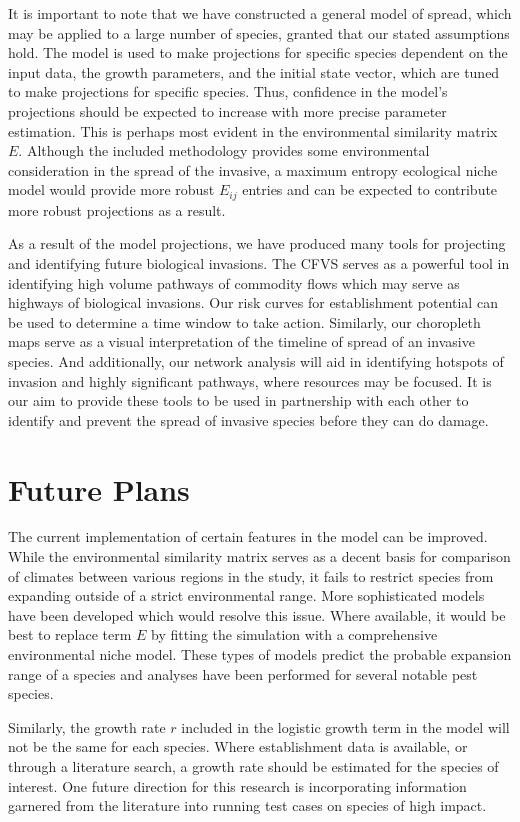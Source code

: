 \documentclass[12pt]{article}
\begin{document}
It is important to note that we have constructed a general model of spread, which may be applied to a large number of species, granted that our stated assumptions hold. The model is used to make projections for specific species dependent on the input data, the growth parameters, and the initial state vector, which are tuned to make projections for specific species.  Thus, confidence in the model's projections should be expected to increase with more precise parameter estimation.  This is perhaps most evident in the environmental similarity matrix $E$. Although the included methodology provides some environmental consideration in the spread of the invasive, a maximum entropy ecological niche model would provide more robust $E_{ij}$ entries and can be expected to contribute more robust projections as a result.

As a result of the model projections, we have produced many tools for projecting and identifying future biological invasions. The CFVS serves as a powerful tool in identifying high volume pathways of commodity flows which may serve as highways of biological invasions. Our risk curves for establishment potential can be used to determine a time window to take action. Similarly, our choropleth maps serve as a visual interpretation of the timeline of spread of an invasive species. And additionally, our network analysis will aid in identifying hotspots of invasion and highly significant pathways, where resources may be focused. It is our aim to provide these tools to be used in partnership with each other to identify and prevent the spread of invasive species before they can do damage.

\section*{Future Plans}

The current implementation of certain features in the model can be improved. While the environmental similarity matrix serves as a decent basis for comparison of climates between various regions in the study, it fails to restrict species from expanding outside of a strict environmental range. More sophisticated models have been developed which would resolve this issue. Where available, it would be best to replace term $E$ by fitting the simulation with a comprehensive environmental niche model. These types of models predict the probable expansion range of a species and analyses have been performed for several notable pest species.

Similarly, the growth rate $r$ included in the logistic growth term in the model will not be the same for each species. Where establishment data is available, or through a literature search, a growth rate should be estimated for the species of interest. One future direction for this research is incorporating information garnered from the literature into running test cases on species of high impact.
\end{document}
